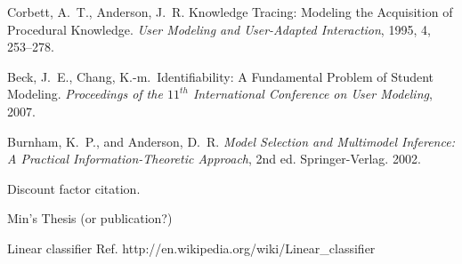 \documentclass[11pt,letterpaper]{article}
\begin{document}
\begin{thebibliography}{9}

  Corbett, A.\ T., Anderson, J.\ R. Knowledge Tracing:  Modeling 
the Acquisition of Procedural Knowledge.  \emph{User Modeling and
 User-Adapted Interaction}, 1995, 4, 253--278.

  Beck, J.\ E., Chang, K.-m.\ Identifiability: A Fundamental Problem of
  Student Modeling.
  \emph{Proceedings of the $11^{th}$ International Conference on User 
    Modeling}, 2007.

Burnham, K.~P., and Anderson, D.~R. \emph{Model
  Selection and Multimodel Inference: A Practical
  Information-Theoretic Approach}, 2nd ed. Springer-Verlag. 2002.


Discount factor citation.

Min's Thesis (or publication?)

Linear classifier Ref. 
     http://en.wikipedia.org/wiki/Linear\_classifier

\end{thebibliography}
\end{document}
